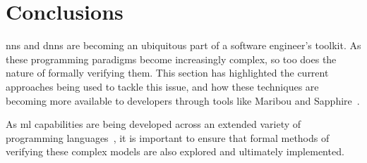 \section{Conclusions}

\glspl{nn} and \glspl{dnn} are becoming an ubiquitous part of a software engineer's toolkit. As these
programming paradigms become increasingly complex, so too does the nature of formally verifying them.
This section has highlighted the current approaches being used to tackle this issue, and how these
techniques are becoming more available to developers through tools like Maribou and Sapphire~\citep{katz2019, kokke2020}.

As \gls{ml} capabilities are being developed across an extended variety of programming languages~\citep{golang2020, shaikhha2019}, it is important to 
ensure that formal methods of verifying these complex models are also explored and ultimately implemented.
